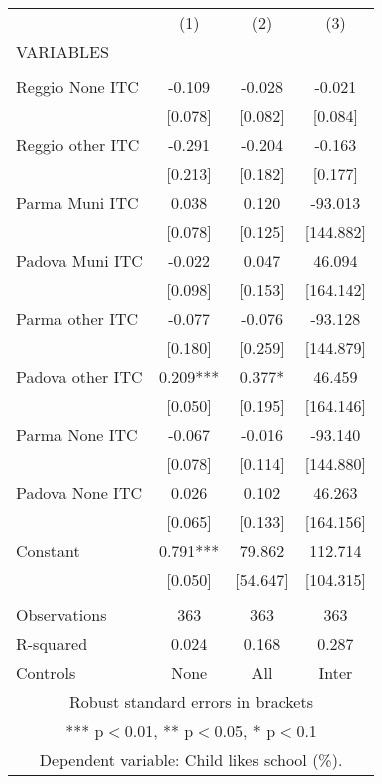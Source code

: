 \begin{tabular}{lccc} \hline
 & (1) & (2) & (3) \\
VARIABLES &  &  &  \\ \hline
 &  &  &  \\
Reggio None ITC & -0.109 & -0.028 & -0.021 \\
 & [0.078] & [0.082] & [0.084] \\
Reggio other ITC & -0.291 & -0.204 & -0.163 \\
 & [0.213] & [0.182] & [0.177] \\
Parma Muni ITC & 0.038 & 0.120 & -93.013 \\
 & [0.078] & [0.125] & [144.882] \\
Padova Muni ITC & -0.022 & 0.047 & 46.094 \\
 & [0.098] & [0.153] & [164.142] \\
Parma other ITC & -0.077 & -0.076 & -93.128 \\
 & [0.180] & [0.259] & [144.879] \\
Padova other ITC & 0.209*** & 0.377* & 46.459 \\
 & [0.050] & [0.195] & [164.146] \\
Parma None ITC & -0.067 & -0.016 & -93.140 \\
 & [0.078] & [0.114] & [144.880] \\
Padova None ITC & 0.026 & 0.102 & 46.263 \\
 & [0.065] & [0.133] & [164.156] \\
Constant & 0.791*** & 79.862 & 112.714 \\
 & [0.050] & [54.647] & [104.315] \\
 &  &  &  \\
Observations & 363 & 363 & 363 \\
R-squared & 0.024 & 0.168 & 0.287 \\
 Controls & None & All & Inter \\ \hline
\multicolumn{4}{c}{ Robust standard errors in brackets} \\
\multicolumn{4}{c}{ *** p$<$0.01, ** p$<$0.05, * p$<$0.1} \\
\multicolumn{4}{c}{ Dependent variable: Child likes school (\%).} \\
\end{tabular}
